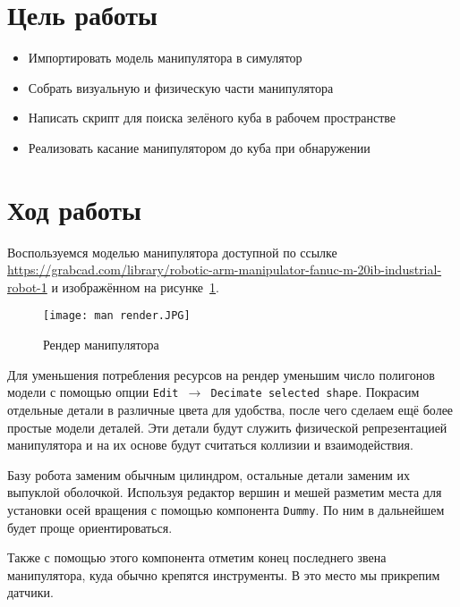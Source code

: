 \documentclass[14pt]{extarticle}
\begin{document}
    

    \section*{Цель работы}
    \begin{itemize}
        \item Импортировать модель манипулятора в симулятор
        \item Собрать визуальную и физическую части манипулятора
        \item Написать скрипт для поиска зелёного куба в рабочем пространстве
        \item Реализовать касание манипулятором до куба при обнаружении
    \end{itemize}

    \section*{Ход работы}

    Воспользуемся моделью манипулятора доступной по ссылке
    \href{https://grabcad.com/library/robotic-arm-manipulator-fanuc-m-20ib-industrial-robot-1}{https://grabcad.com/library/robotic-arm-manipulator-fanuc-m-20ib-industrial-robot-1}
    и изображённом на рисунке~\ref{pic:man render}.

    \begin{figure}[H]
        \centering
        \texttt{[image: man render.JPG]}
        \caption{Рендер манипулятора}
        \label{pic:man render}
    \end{figure}

    Для уменьшения потребления ресурсов на рендер уменьшим число полигонов модели с помощью опции \texttt{Edit $\rightarrow$ Decimate selected shape}.
    Покрасим отдельные детали в различные цвета для удобства, после чего сделаем ещё более простые модели деталей. Эти
    детали будут служить физической репрезентацией манипулятора и на их основе будут считаться коллизии и взаимодействия.

    Базу робота заменим обычным цилиндром, остальные детали заменим их выпуклой оболочкой. Используя редактор вершин и
    мешей разметим места для установки осей вращения с помощью компонента \texttt{Dummy}. По ним в дальнейшем будет
    проще ориентироваться.

    Также с помощью этого компонента отметим конец последнего звена манипулятора, куда обычно крепятся инструменты. В
    это место мы прикрепим датчики.
\end{document}

